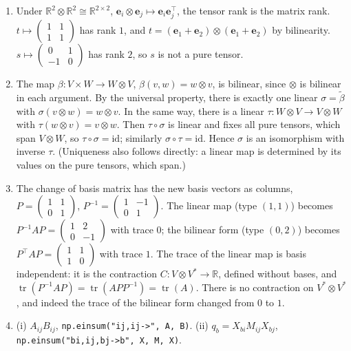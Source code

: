 \documentclass[11pt]{article}
\DeclareMathOperator{\tr}{tr}
\begin{document}
\begin{enumerate}[label=(\alph*)]
    \item Under $\mathbb{R}^2 \otimes \mathbb{R}^2 \cong \mathbb{R}^{2 \times 2}$, $\mathbf{e}_i \otimes \mathbf{e}_j \mapsto \mathbf{e}_i\mathbf{e}_j^\top$, the tensor rank is the matrix rank. $t \mapsto \begin{pmatrix} 1 & 1 \\ 1 & 1 \end{pmatrix}$ has rank $1$, and $t = (\mathbf{e}_1 + \mathbf{e}_2) \otimes (\mathbf{e}_1 + \mathbf{e}_2)$ by bilinearity. $s \mapsto \begin{pmatrix} 0 & 1 \\ -1 & 0 \end{pmatrix}$ has rank $2$, so $s$ is not a pure tensor.
    \item The map $\beta: V \times W \to W \otimes V$, $\beta(v, w) = w \otimes v$, is bilinear, since $\otimes$ is bilinear in each argument. By the universal property, there is exactly one linear $\sigma = \tilde\beta$ with $\sigma(v \otimes w) = w \otimes v$. In the same way, there is a linear $\tau: W \otimes V \to V \otimes W$ with $\tau(w \otimes v) = v \otimes w$. Then $\tau \circ \sigma$ is linear and fixes all pure tensors, which span $V \otimes W$, so $\tau \circ \sigma = \mathrm{id}$; similarly $\sigma \circ \tau = \mathrm{id}$. Hence $\sigma$ is an isomorphism with inverse $\tau$. (Uniqueness also follows directly: a linear map is determined by its values on the pure tensors, which span.)
    \item The change of basis matrix has the new basis vectors as columns, $P = \begin{pmatrix} 1 & 1 \\ 0 & 1 \end{pmatrix}$, $P^{-1} = \begin{pmatrix} 1 & -1 \\ 0 & 1 \end{pmatrix}$. The linear map (type $(1, 1)$) becomes $P^{-1}AP = \begin{pmatrix} 1 & 2 \\ 0 & -1 \end{pmatrix}$ with trace $0$; the bilinear form (type $(0, 2)$) becomes $P^\top AP = \begin{pmatrix} 1 & 1 \\ 1 & 0 \end{pmatrix}$ with trace $1$. The trace of the linear map is basis independent: it is the contraction $C: V \otimes V^* \to \mathbb{R}$, defined without bases, and $\tr(P^{-1}AP) = \tr(APP^{-1}) = \tr(A)$. There is no contraction on $V^* \otimes V^*$, and indeed the trace of the bilinear form changed from $0$ to $1$.
    \item (i) $A_{ij}B_{ij}$, \texttt{np.einsum("ij,ij->", A, B)}. (ii) $q_b = X_{bi}M_{ij}X_{bj}$, \texttt{np.einsum("bi,ij,bj->b", X, M, X)}.
\end{enumerate}
\end{document}
